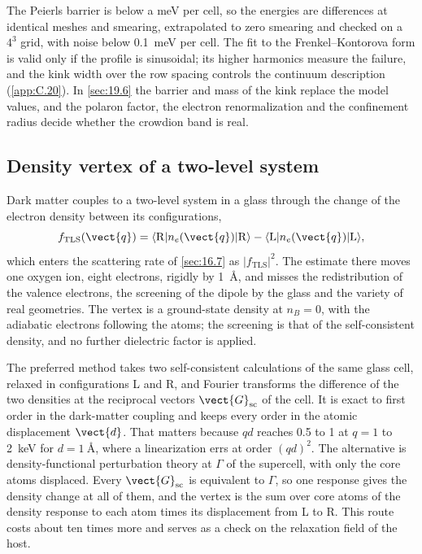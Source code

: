 The Peierls barrier is below a meV per cell, so the energies are differences at identical meshes and smearing, extrapolated to zero smearing and checked on a $4^3$ grid, with noise below \SI{0.1}{meV} per cell. The fit to the Frenkel--Kontorova form is valid only if the profile is sinusoidal; its higher harmonics measure the failure, and the kink width over the row spacing controls the continuum description (\cref{app:C.20}). In \cref{sec:19.6} the barrier and mass of the kink replace the model values, and the polaron factor, the electron renormalization and the confinement radius decide whether the crowdion band is real.

\subsection{Density vertex of a two-level system}

Dark matter couples to a two-level system in a glass through the change of the electron density between its configurations,
\begin{equation}
  f_{\mathrm{TLS}}(\vect{q}) = \langle\mathrm{R}|n_e(\vect{q})|\mathrm{R}\rangle - \langle\mathrm{L}|n_e(\vect{q})|\mathrm{L}\rangle ,
  \label{eq:E.22-fTLS}
\end{equation}
which enters the scattering rate of \cref{sec:16.7} as $|f_{\mathrm{TLS}}|^2$. The estimate there moves one oxygen ion, eight electrons, rigidly by \SI{1}{\angstrom}, and misses the redistribution of the valence electrons, the screening of the dipole by the glass and the variety of real geometries. The vertex is a ground-state density at $n_B = 0$, with the adiabatic electrons following the atoms; the screening is that of the self-consistent density, and no further dielectric factor is applied.

The preferred method takes two self-consistent calculations of the same glass cell, relaxed in configurations L and R, and Fourier transforms the difference of the two densities at the reciprocal vectors $\vect{G}_{\mathrm{sc}}$ of the cell. It is exact to first order in the dark-matter coupling and keeps every order in the atomic displacement $\vect{d}$. That matters because $qd$ reaches 0.5 to 1 at $q = 1$ to \SI{2}{keV} for $d = \SI{1}{\angstrom}$, where a linearization errs at order $(qd)^2$. The alternative is density-functional perturbation theory at $\Gamma$ of the supercell, with only the core atoms displaced. Every $\vect{G}_{\mathrm{sc}}$ is equivalent to $\Gamma$, so one response gives the density change at all of them, and the vertex is the sum over core atoms of the density response to each atom times its displacement from L to R. This route costs about ten times more and serves as a check on the relaxation field of the host.

